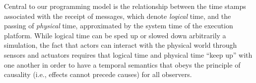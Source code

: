 \documentclass[sigconf]{acmart}
\newcommand{\marten}[1]{\mynote{Marten}{#1}{cyan}}%
\begin{document}
Central to our programming model is the relationship between the time stamps associated with the receipt of messages, which denote \emph{logical} time, and the passing of \emph{physical} time, approximated by the system time of the execution platform. While logical time can be sped up or slowed down arbitrarily a simulation, the fact that actors can interact with the physical world through sensors and actuators requires that logical time and physical time ``keep up'' with one another in order to have a temporal semantics that obeys the principle of causality (i.e., effects cannot precede causes) for all observers. 







   




\end{document}
